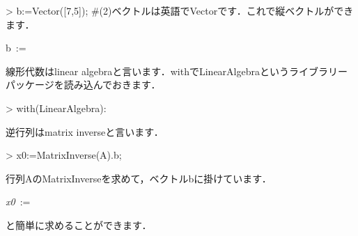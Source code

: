 \begin{MapleInput}
> b:=Vector([7,5]); #(2)ベクトルは英語でVectorです．これで縦ベクトルができます．
\end{MapleInput}
\begin{MapleOutput}
b\, := \, \left[ \begin {array}{c} 7\\ 5\end {array} \right]
\end{MapleOutput}
線形代数はlinear algebraと言います．withでLinearAlgebraというライブラリーパッケージを読み込んでおきます．
\begin{MapleInput}
> with(LinearAlgebra): 
\end{MapleInput}
逆行列はmatrix inverseと言います．
\begin{MapleInput}
> x0:=MatrixInverse(A).b;
\end{MapleInput}
行列AのMatrixInverseを求めて，ベクトルbに掛けています．
\begin{MapleOutput}
{\it x0}\, := \, \left[ \begin {array}{c} 1\\ 1\end {array} \right] 
\end{MapleOutput}
と簡単に求めることができます．
